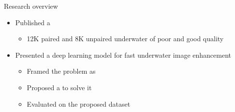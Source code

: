 \documentclass{cubeamer}
\begin{document}
\begin{frame}{Research overview}
    \begin{itemize}
        \item Published a 
        \begin{itemize}
            \item 12K paired and 8K unpaired underwater of poor and good quality
        \end{itemize}
        \item Presented a deep learning model for fast underwater image  enhancement
        \begin{itemize}
            \item Framed the problem as 
            \item Proposed a  to solve it
            \item Evaluated on the proposed dataset
        \end{itemize}
    \end{itemize}
\end{frame}
\end{document}

